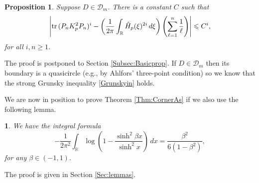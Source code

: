 \documentclass{article}
\numberwithin{equation}{section}
\numberwithin{figure}{section}
\theoremstyle{plain}
\theoremstyle{plain}
\newtheorem{lemma}[thm]{\protect\lemmaname}
\numberwithin{thm}{section}
\newtheorem{proposition}[thm]{Proposition}
\theoremstyle{remark}
\providecommand{\lemmaname}{Lemma}
\newcommand{\Tr}{\text{{\rm tr\,}}}
\newcommand{\R}{\mathbb{R}}
\let \le \leqslant
\let \ge \geqslant
\begin{document}
\begin{proposition}\label{Prop:TrComp2}
Suppose $D\in\mathcal{D}_m$. There is a constant $C$ such that 
\begin{equation}\label{TrComp2}
\left|\Tr(P_nK_p^2P_n)^i-\left(\frac 1{2\pi}\int_\R \hat{H}_p(\xi)^{2i}\,d\xi\right)\left(\sum_{\ell=1}^n\frac 1\ell\right)\right|\le C^i,
\end{equation}
for all $i,n\ge 1$.
\end{proposition}
The proof is postponed to Section \ref{Subsec:Basicprop}. 
If $D\in\mathcal{D}_m$ then its boundary is a quasicircle (e.g., by Ahlfors' three-point condition) so we know that the strong Grunsky inequality \eqref{Grunskyin} holds.


We are now in position to prove Theorem \ref{Thm:CornerAs} if we also use the following lemma.
\begin{lemma}\label{Lem:Finalintegral}
We have the integral formula
\begin{equation}\label{Finalintegral}
-\frac 1{2\pi^2}\int_\R\log\left(1-\frac{\sinh^2\beta x}{\sinh^2x}\right)\,dx=\frac{\beta^2}{6(1-\beta^2)},
\end{equation}
for any $\beta\in (-1,1)$.
\end{lemma}
The proof is given in Section \ref{Sec:lemmas}.
\end{document}
